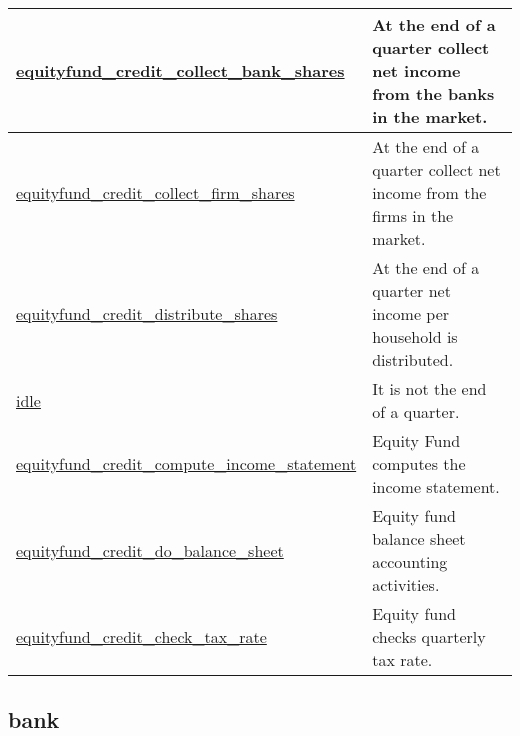 \documentclass[a4paper,11pt]{article}
\begin{document}
\begin{longtable}[H!]{ll}
\midrule
\parbox{5cm}{\url{equityfund_credit_collect_bank_shares}}  & \parbox{10cm}{At the end of a quarter collect net income from the banks in the market.} \\
\midrule
\parbox{5cm}{\url{equityfund_credit_collect_firm_shares}}  & \parbox{10cm}{At the end of a quarter collect net income from the firms in the market.} \\
\midrule
\parbox{5cm}{\url{equityfund_credit_distribute_shares}}  & \parbox{10cm}{At the end of a quarter net income per household is distributed.} \\
\midrule
\parbox{5cm}{\url{idle}}  & \parbox{10cm}{It is not the end of a quarter.} \\
\midrule
\parbox{5cm}{\url{equityfund_credit_compute_income_statement}}  & \parbox{10cm}{Equity Fund computes the income statement.} \\
\midrule
\parbox{5cm}{\url{equityfund_credit_do_balance_sheet}}  & \parbox{10cm}{Equity fund balance sheet accounting activities.} \\
\midrule
\parbox{5cm}{\url{equityfund_credit_check_tax_rate}}  & \parbox{10cm}{Equity fund checks quarterly tax rate.} \\
\end{longtable}

\subsection{bank}
\end{document}
